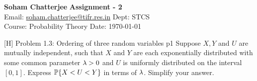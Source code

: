 \documentclass[a4paper, 11pt]{article}
\begin{document}
	
	
	\textsf{\noindent \large\textbf{Soham Chatterjee} \hfill \textbf{Assignment - 2}\\
		Email: \href{soham.chatterjee@tifr.res.in}{soham.chatterjee@tifr.res.in} \hfill Dept: STCS\\
		\normalsize Course: Probability Theory \hfill Date: \today}
	
	
\begin{problem}{%
		[H] Problem 1.3: Ordering of three random variables
	}{p1%
}
Suppose $X,Y$ and $U$ are mutually independent, such that $X$ and $Y$ are each exponentially distributed with some common parameter $\lambda>0$ and $U$ is uniformly distributed on the interval $[0,1]$. Express $\mathbb{P}\{X<U<Y\}$ in terms of $\lambda$. Simplify your answer.
\end{problem}
\end{document}
